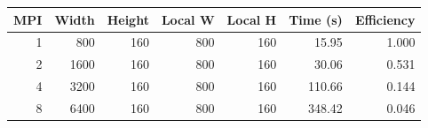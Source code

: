 \begin{tabular}{@{}rrrrrrr@{}}
\toprule
MPI & Width & Height & Local W & Local H & Time (s) & Efficiency \\
\midrule
1 & 800 & 160 & 800 & 160 & 15.95 & 1.000 \\
2 & 1600 & 160 & 800 & 160 & 30.06 & 0.531 \\
4 & 3200 & 160 & 800 & 160 & 110.66 & 0.144 \\
8 & 6400 & 160 & 800 & 160 & 348.42 & 0.046 \\
\bottomrule
\end{tabular}
